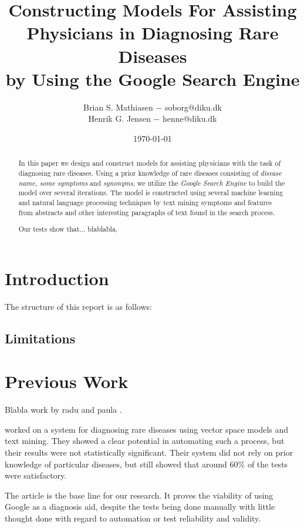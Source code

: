 \documentclass[10pt,letterpaper,final]{article}
\title{Constructing Models For Assisting Physicians in Diagnosing Rare Diseases\\
        \small{by Using the Google Search Engine}}
\author{Brian S. Mathiasen $-$ soborg@diku.dk \\
        Henrik G. Jensen $-$ henne@diku.dk\\
}
\date{\today} %
\begin{document}
\maketitle
\listoffixmes


\begin{abstract}
In this paper we design and construct models for assisting physicians
with the task of diagnosing rare diseases. Using a prior knowledge of
rare diseases consisting of \textit{disease name, some symptoms} and
\textit{synonyms}, we utilize the \textit{Google Search Engine} to build
the model over several iterations. The model is constructed using
several machine learning and natural language processing techniques by
text mining symptoms and features from abstracts and other interesting
paragraphs of text found in the search process.

Our tests show that... blablabla, 
\end{abstract}
\section{Introduction}
\label{chap:introduction}


The structure of this report is as follows:

\subsection{Limitations}


\section{Previous Work}
Blabla work by radu and paula \cite{radupaula}.


\cite{jensenandersen} worked on a system for diagnosing rare diseases
using vector space models and text mining. They showed a clear potential
in automating such a process, but their results were not statistically
significant. Their system did not rely on prior knowledge of particular
diseases, but still showed that around 60\% of the tests were
satisfactory.


The article \cite{googlingdiagnosis} is the base line for our research.
It proves the viability of using Google as a diagnosis aid, despite the
tests being done manually with little thought done with regard to
automation or test reliability and validity.
\end{document}
